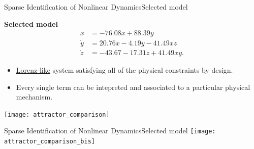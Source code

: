 \begin{frame}[t, c]{Sparse Identification of Nonlinear Dynamics}{Selected model}
  \begin{minipage}{.68\textwidth}
    
    \begin{block}{\centering \textbf{Selected model}}
      \[
        \begin{aligned}
          \dot{x} & = -76.08 x + 88.39 y \\
          \dot{y} & = 20.76 x - 4.19 y - 41.49 xz \\
          \dot{z} & = -43.67 - 17.31 z + 41.49 xy.
        \end{aligned}
      \]
    \end{block}
    
    \medskip
    
    \begin{itemize}
    \item \underline{Lorenz-like} system satisfying all of the physical constraints by design.
      
      \medskip
      
    \item Every single term can be intepreted and associated to a particular physical mechanism.
    \end{itemize}
  \end{minipage}%
  \hfill
  \begin{minipage}{.28\textwidth}
    \centering
    \texttt{[image: attractor\_comparison]}
  \end{minipage}
  
  \vspace{1cm}
\end{frame}

\begin{frame}[t, c]{Sparse Identification of Nonlinear Dynamics}{Selected model}
  \centering
  \texttt{[image: attractor\_comparison\_bis]}
\end{frame}


  
    
    
